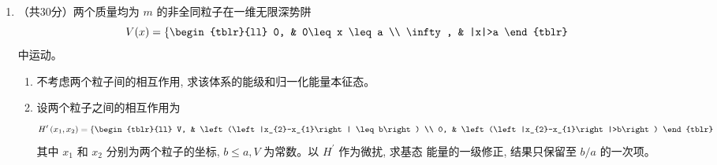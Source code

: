 \begin{enumerate}
{\begin{enumerate}
	\end{enumerate}
	
	
}


\newpage
\item 
（共30分）两个质量均为 $m$ 的非全同粒子在一维无限深势阱
$$
V(x)=\left\{\begin{tblr}{ll}
	0, & 0\leq x \leq a \\
	\infty, & |x|>a
\end{tblr}\right.
$$
中运动。
\begin{enumerate}
	\item
	不考虑两个粒子间的相互作用, 求该体系的能级和归一化能量本征态。 
	\item 
	设两个粒子之间的相互作用为
	$$
	H^{\prime}\left(x_{1}, x_{2}\right)=\left\{\begin{tblr}{ll}
		V, & \left(\left|x_{2}-x_{1}\right| \leq b\right) \\
		0, & \left(\left|x_{2}-x_{1}\right|>b\right)
	\end{tblr}\right.
	$$
	其中 $x_{1}$ 和 $x_{2}$ 分别为两个粒子的坐标, $b \leq a, V$ 为常数。以 $H^{\prime}$ 作为微扰, 求基态 能量的一级修正, 结果只保留至 $b / a$ 的一次项。
	

\end{enumerate}
\end{enumerate}
